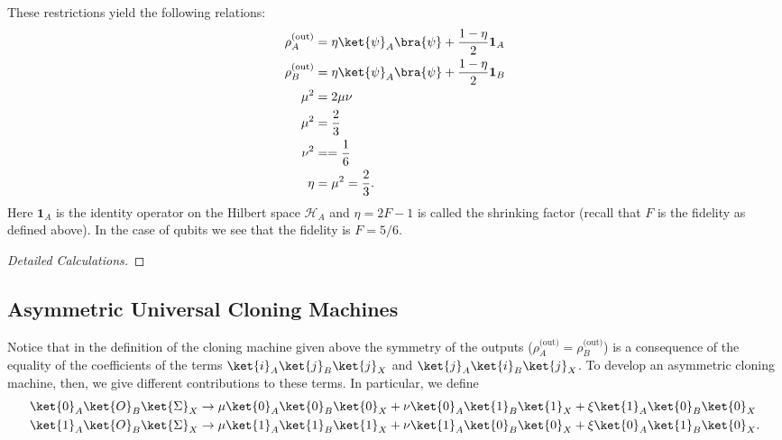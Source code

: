 \documentclass[reqno]{amsart}
\numberwithin{lemma}{section}
\numberwithin{proposition}{section}
\begin{document}
These restrictions yield the following relations:
\begin{align*}
    \rho_{A}^{\text{(out)}} &= \eta \ket{\psi}_{A}\bra{\psi} + \frac{1 - \eta}{2} \mathbf{1}_{A}\\
    \rho_{B}^{\text{(out)}} &= \eta \ket{\psi}_{A} \bra{\psi} + \frac{1 - \eta}{2} \mathbf{1}_{B}\\
    \mu^{2} &= 2\mu \nu\\
    \mu^{2} &= \frac{2}{3}\\
    \nu^{2} &= = \frac{1}{6}\\
    \eta &= \mu^{2} = \frac{2}{3}.
\end{align*}
Here $\mathbf{1}_{A}$ is the identity operator on the Hilbert space $\mathcal{H}_{A}$ and $\eta = 2F - 1$ is called the shrinking factor (recall that $F$ is the fidelity as defined above). In the case of qubits we see that the fidelity is $F = 5/6$.

\begin{proof}[Detailed Calculations]
{\color{red}{Need to fill in the calculations for the previous relations.}}
\end{proof}

\subsection{Asymmetric Universal Cloning Machines}
Notice that in the definition of the cloning machine given above the symmetry of the outputs ($\rho_{A}^{\text{(out)}} = \rho_{B}^{\text{(out)}}$) is a consequence of the equality of the coefficients of the terms $\ket{i}_{A} \ket{j}_{B} \ket{j}_{X}$ and $\ket{j}_{A} \ket{i}_{B} \ket{j}_{X}$. To develop an asymmetric cloning machine, then, we give different contributions to these terms. In particular, we define
\begin{align*}
    \ket{0}_{A} \ket{O}_{B} \ket{\Sigma}_{X} &\to \mu \ket{0}_{A} \ket{0}_{B} \ket{0}_{X} + \nu \ket{0}_{A} \ket{1}_{B} \ket{1}_{X} + \xi \ket{1}_{A} \ket{0}_{B} \ket{0}_{X}\\
    \ket{1}_{A} \ket{O}_{B} \ket{\Sigma}_{X} &\to \mu \ket{1}_{A} \ket{1}_{B} \ket{1}_{X} + \nu \ket{1}_{A} \ket{0}_{B} \ket{0}_{X} + \xi \ket{0}_{A} \ket{1}_{B} \ket{0}_{X}.
\end{align*}
\end{document}
